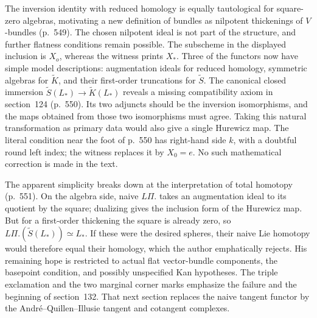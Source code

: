 The inversion identity with reduced homology is equally tautological for square-zero algebras, motivating a new definition of bundles as nilpotent thickenings of $V$-bundles (p.~549). The chosen nilpotent ideal is not part of the structure, and further flatness conditions remain possible. The subscheme in the displayed inclusion is $X_o$, whereas the witness prints $X_*$. Three of the functors now have simple model descriptions: augmentation ideals for reduced homology, symmetric algebras for $\widetilde K$, and their first-order truncations for $\widetilde S$. The canonical closed immersion $\widetilde S(L_*)\to\widetilde K(L_*)$ reveals a missing compatibility axiom in section~124 (p.~550). Its two adjuncts should be the inversion isomorphisms, and the maps obtained from those two isomorphisms must agree. Taking this natural transformation as primary data would also give a single Hurewicz map. The literal condition near the foot of p.~550 has right-hand side $k$, with a doubtful round left index; the witness replaces it by $X_0=e$. No such mathematical correction is made in the text.

The apparent simplicity breaks down at the interpretation of total homotopy (p.~551). On the algebra side, naive $L\Pi.$ takes an augmentation ideal to its quotient by the square; dualizing gives the inclusion form of the Hurewicz map. But for a first-order thickening the square is already zero, so $L\Pi.(\widetilde S(L_*))\simeq L_*$. If these were the desired spheres, their naive Lie homotopy would therefore equal their homology, which the author emphatically rejects. His remaining hope is restricted to actual flat vector-bundle components, the basepoint condition, and possibly unspecified Kan hypotheses. The triple exclamation and the two marginal corner marks emphasize the failure and the beginning of section~132. That next section replaces the naive tangent functor by the Andr\'e--Quillen--Illusie tangent and cotangent complexes.

